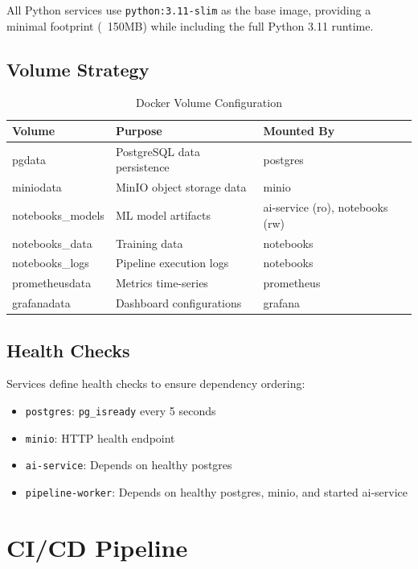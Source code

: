 All Python services use \texttt{python:3.11-slim} as the base image, providing a minimal footprint (~150MB) while including the full Python 3.11 runtime.

\subsection{Volume Strategy}

\begin{table}[H]
\centering
\caption{Docker Volume Configuration}
\label{tab:volumes}
\begin{tabular}{@{}lll@{}}
\toprule
\textbf{Volume} & \textbf{Purpose} & \textbf{Mounted By} \\
\midrule
pgdata & PostgreSQL data persistence & postgres \\
miniodata & MinIO object storage data & minio \\
notebooks\_models & ML model artifacts & ai-service (ro), notebooks (rw) \\
notebooks\_data & Training data & notebooks \\
notebooks\_logs & Pipeline execution logs & notebooks \\
prometheusdata & Metrics time-series & prometheus \\
grafanadata & Dashboard configurations & grafana \\
\bottomrule
\end{tabular}
\end{table}

\subsection{Health Checks}

Services define health checks to ensure dependency ordering:

\begin{itemize}
    \item \texttt{postgres}: \texttt{pg\_isready} every 5 seconds
    \item \texttt{minio}: HTTP health endpoint
    \item \texttt{ai-service}: Depends on healthy postgres
    \item \texttt{pipeline-worker}: Depends on healthy postgres, minio, and started ai-service
\end{itemize}

\section{CI/CD Pipeline}

